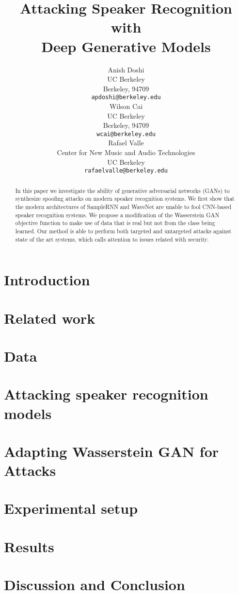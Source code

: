 \documentclass{article}
\title{Attacking Speaker Recognition with \\Deep Generative Models}
\author{
  Anish Doshi \\
  UC Berkeley \\
  Berkeley, 94709 \\
  \texttt{apdoshi@berkeley.edu} \\
  \And
  Wilson Cai\\
  UC Berkeley\\
  Berkeley, 94709 \\
  \texttt{wcai@berkeley.edu} \\
  \And
  Rafael Valle \\
  Center for New Music and Audio Technologies \\
  UC Berkeley \\
  \texttt{rafaelvalle@berkeley.edu} \\
}
\begin{document}

\maketitle

\begin{abstract}
    In this paper we investigate the ability of generative adversarial networks (GANs) to synthesize spoofing attacks on modern speaker recognition systems. We first show that the modern architectures of SampleRNN 
    and WaveNet are unable to fool CNN-based speaker recognition systems. We propose  
    a modification of the Wasserstein GAN objective function to make use of data that is 
    real but not from the class being learned. Our method is able to perform both targeted and untargeted attacks against state of the art systems, which calls attention to issues related with security. 
\end{abstract}

\section{Introduction} \label{sec:introduction}

%
\section{Related work}\label{sec:related_work}

%
\section{Data}\label{sec:method}

%
\section{Attacking speaker recognition models}\label{sec:spk_rec_atks}

%
\section{Adapting Wasserstein GAN for Attacks}\label{sec:wgan}

%
\section{Experimental setup}\label{sec:experiments}
%
\section{Results}
\label{sec:results}

%
\section{Discussion and Conclusion}\label{sec:conclusions}

%



\end{document}
